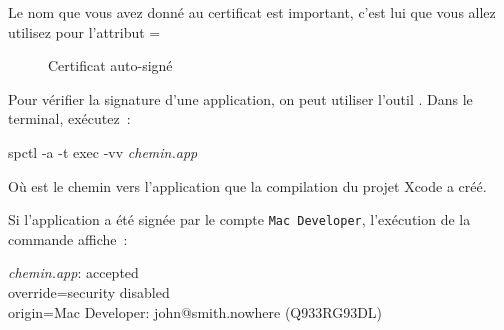 Le nom que vous avez donné au certificat est important, c'est lui que vous allez utilisez pour l'attribut \ggs=%
\begin{galgas}
\end{galgas}


\begin{figure}[!t]
  \centering
  \hspace{0.5cm}
  \caption{Certificat auto-signé}
\end{figure}






Pour vérifier la signature d'une application, on peut utiliser l'outil . Dans le terminal, exécutez~:
\begin{SHELL}
spctl -a -t exec -vv \emph{chemin.app}
\end{SHELL}

Où  est le chemin vers l'application que la compilation du projet Xcode a créé.

Si l'application a été signée par le compte \texttt{Mac Developer}, l'exécution de la commande affiche~:

\begin{SHELL}
\emph{chemin.app}: accepted\\
override=security disabled\\
origin=Mac Developer: john@smith.nowhere (Q933RG93DL)
\end{SHELL}


